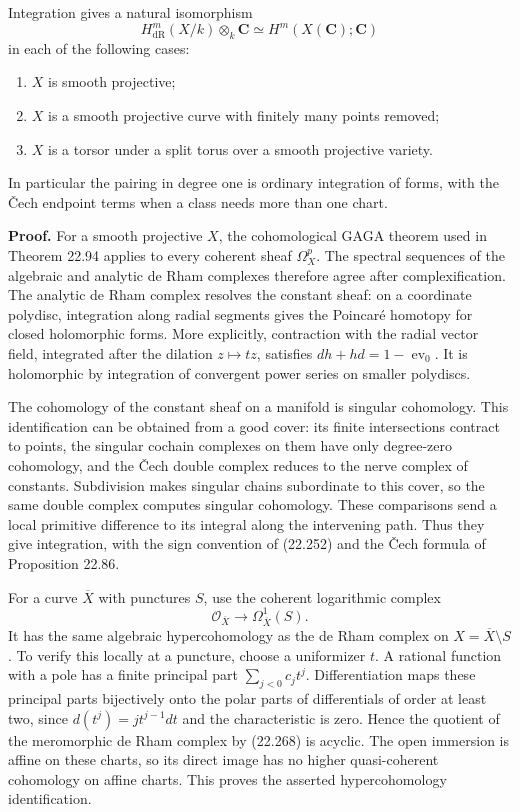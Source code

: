 \documentclass[
  11pt,
  a4paper,
]{article}
\providecommand{\tightlist}{%
  \setlength{\itemsep}{0pt}\setlength{\parskip}{0pt}}
\begin{document}
Integration gives a natural isomorphism \[
 H^m_{\mathrm{dR}}(X/k)\otimes_k\mathbf C
       \simeq H^m(X(\mathbf C);\mathbf C)
 \tag{22.267}
\] in each of the following cases:

\begin{enumerate}
\def\labelenumi{\arabic{enumi}.}
\tightlist
\item
  \(X\) is smooth projective;
\item
  \(X\) is a smooth projective curve with finitely many points removed;
\item
  \(X\) is a torsor under a split torus over a smooth projective
  variety.
\end{enumerate}

In particular the pairing in degree one is ordinary integration of
forms, with the Čech endpoint terms when a class needs more than one
chart.

\textbf{Proof.} For a smooth projective \(X\), the cohomological GAGA
theorem used in Theorem 22.94 applies to every coherent sheaf
\(\Omega_X^p\). The spectral sequences of the algebraic and analytic de
Rham complexes therefore agree after complexification. The analytic de
Rham complex resolves the constant sheaf: on a coordinate polydisc,
integration along radial segments gives the Poincaré homotopy for closed
holomorphic forms. More explicitly, contraction with the radial vector
field, integrated after the dilation \(z\mapsto tz\), satisfies
\(dh+hd=1-\operatorname{ev}_0\). It is holomorphic by integration of
convergent power series on smaller polydiscs.

The cohomology of the constant sheaf on a manifold is singular
cohomology. This identification can be obtained from a good cover: its
finite intersections contract to points, the singular cochain complexes
on them have only degree-zero cohomology, and the Čech double complex
reduces to the nerve complex of constants. Subdivision makes singular
chains subordinate to this cover, so the same double complex computes
singular cohomology. These comparisons send a local primitive difference
to its integral along the intervening path. Thus they give integration,
with the sign convention of (22.252) and the Čech formula of Proposition
22.86.

For a curve \(\overline X\) with punctures \(S\), use the coherent
logarithmic complex \[
 \mathcal O_{\overline X}\longrightarrow
               \Omega^1_{\overline X}(S).
 \tag{22.268}
\] It has the same algebraic hypercohomology as the de Rham complex on
\(X=\overline X\setminus S\). To verify this locally at a puncture,
choose a uniformizer \(t\). A rational function with a pole has a finite
principal part \(\sum_{j<0}c_jt^j\). Differentiation maps these
principal parts bijectively onto the polar parts of differentials of
order at least two, since \(d(t^j)=jt^{j-1}dt\) and the characteristic
is zero. Hence the quotient of the meromorphic de Rham complex by
(22.268) is acyclic. The open immersion is affine on these charts, so
its direct image has no higher quasi-coherent cohomology on affine
charts. This proves the asserted hypercohomology identification.
\end{document}
